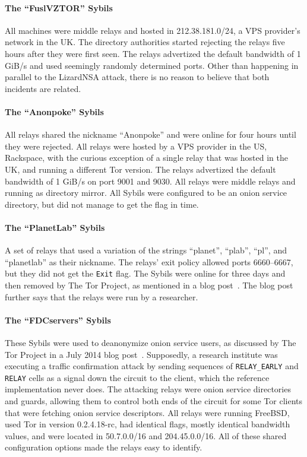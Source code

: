 \paragraph{The ``FuslVZTOR'' Sybils}
All machines were middle relays and hosted in 212.38.181.0/24, a VPS provider's
network in the UK.  The directory authorities started rejecting the relays five
hours after they were first seen.  The relays advertized the default bandwidth
of 1 GiB/s and used seemingly randomly determined ports.  Other than happening
in parallel to the LizardNSA attack, there is no reason to believe that both
incidents are related.

\paragraph{The ``Anonpoke'' Sybils}
All relays shared the nickname ``Anonpoke'' and were online for four hours until
they were rejected.  All relays were hosted by a VPS provider in the US,
Rackspace, with the curious exception of a single relay that was hosted in the
UK, and running a different Tor version.  The relays advertized the default
bandwidth of 1 GiB/s on port 9001 and 9030.  All relays were middle relays and
running as directory mirror.  All Sybils were configured to be an onion service
directory, but did not manage to get the flag in time.

\paragraph{The ``PlanetLab'' Sybils}
A set of relays that used a variation of the strings ``planet'', ``plab'',
``pl'', and ``planetlab'' as their nickname.  The relays' exit policy allowed
ports 6660--6667, but they did not get the \texttt{Exit} flag.  The Sybils were
online for three days and then removed by The Tor Project, as mentioned in a
blog post~\cite{progressreport}.  The blog post further says that the relays
were run by a researcher.

\paragraph{The ``FDCservers'' Sybils}
These Sybils were used to deanonymize onion service users, as discussed by The
Tor Project in a July 2014 blog post~\cite{cmucert}.  Supposedly, a research
institute was executing a traffic confirmation attack by sending sequences of
\texttt{RELAY\_EARLY} and \texttt{RELAY} cells as a signal down the circuit to
the client, which the reference implementation never does.  The attacking relays
were onion service directories and guards, allowing them to control both ends of
the circuit for some Tor clients that were fetching onion service descriptors.
All relays were running FreeBSD, used Tor in version 0.2.4.18-rc, had identical
flags, mostly identical bandwidth values, and were located in 50.7.0.0/16 and
204.45.0.0/16.  All of these shared configuration options made the relays easy
to identify.

